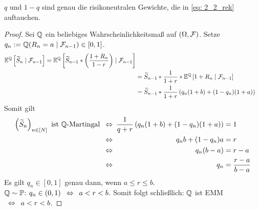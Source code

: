 \begin{*bemerkung_inline}
	$q$ und $1-q$ sind genau die risikoneutralen Gewichte, die in \eqref{eq: 2_2_rek} auftauchen.
\end{*bemerkung_inline}

\begin{proof}
	Sei $\mathbb{Q}$ ein beliebiges Wahrscheinlichkeitsmaß auf $(\Omega, \mathcal{F})$. Setze $q_n \mathrel{:=} \mathbb{Q}(R_n = a \mid \mathcal{F}_{n-1}) \in [0,1]$.
	\begin{equation*}
		\begin{aligned}
			\mathbb{E}^{\mathbb{Q}}\left[ \widetilde{S}_n \mid \mathcal{F}_{n-1} \right] = \mathbb{E}^{\mathbb{Q}}\left[ \widetilde{S}_{n-1} * \left( \frac{1+R_n}{1-r} \right)  \mid \mathcal{F}_{n-1} \right] \\
			&= \widetilde{S}_{n-1} * \frac{1}{1+r} * \mathbb{E}^{\mathbb{Q}}\left[ 1+R_n \mid \mathcal{F}_{n-1} \right] \\
			&= \widetilde{S}_{n-1} * \frac{1}{1+r} \left( q_n (1+b) + (1-q_n)(1+a) \right)
		\end{aligned}
	\end{equation*}
	Somit gilt 
	\begin{equation*}
		\begin{alignedat}{2}
			\left( \widetilde{S}_n \right)_{n \in [N]} \text{ ist } \mathbb{Q} \text{-Martingal} &\enskip \Leftrightarrow \enskip &\frac{1}{q+r} \left( q_n (1+b) + (1-q_n)(1+a) \right) &= 1 \\
			&\enskip \Leftrightarrow \enskip &q_n b + (1-q_n) a &= r \\
			&\enskip \Leftrightarrow \enskip &q_n (b-a) &= r-a \\
			&\enskip \Leftrightarrow \enskip &q_n &= \frac{r-a}{b-a}
		\end{alignedat}
	\end{equation*}
	Es gilt $q_n \in [0,1]$ genau dann, wenn $a \le r \le b$. \\ 
	$\mathbb{Q} \sim \mathbb{P}$: $q_n \in (0,1) \enskip \Leftrightarrow \enskip a < r < b$.
	Somit folgt schließlich: $\mathbb{Q}$ ist EMM $\enskip \Leftrightarrow \enskip a < r < b$.
\end{proof}

